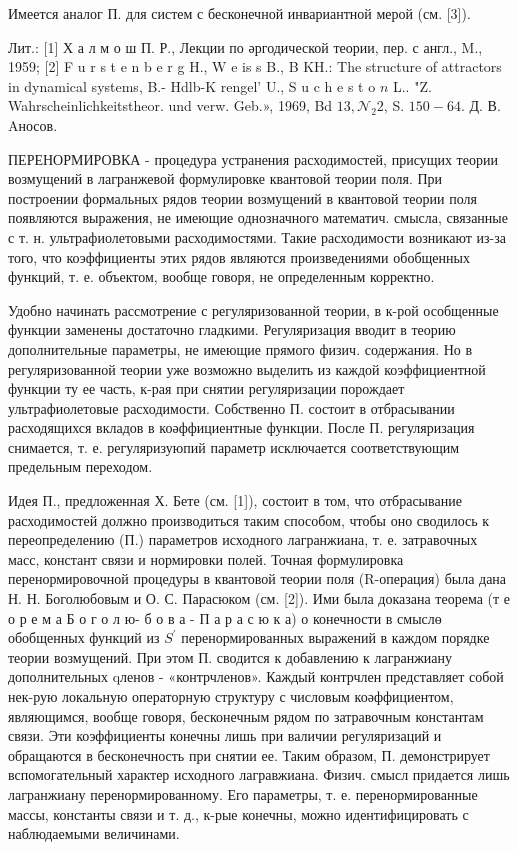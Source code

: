 \documentclass[10pt]{article}
\begin{document}
Имеется аналог П. для систем с бесконечной инвариантной мерой (см. [3]).



Лит.: [1] Х а л м о ш П. Р., Лекции по әргодической теории, пер. с англ., M., 1959; [2] F u r s t e n b e r g H., W e is s B., B KH.: The structure of attractors in dynamical systems, B.- Hdlb-K rengel' U., S u c h e s t o $n$ L.. "Z. Wahrscheinlichkeitstheor. und verw. Geb.», 1969, Bd $13, \mathcal{N}_{2} 2$, S. $150-64$. Д. В. Aносов.



ПЕРЕНОРМИРОВКА - процедура устранения расходимостей, присущих теории возмущений в лагранжевой формулировке квантовой теории поля. При построении формальных рядов теории возмущений в квантовой теории поля появляются выражения, не имеющие однозначного математич. смысла, связанные с т. н. ультрафиолетовыми расходимостями. Такие расходимости возникают из-за того, что коэффициенты этих рядов являются произведениями обобщенных функций, т. е. объектом, вообще говоря, не определенным корректно.



Удобно начинать рассмотрение с регуляризованной теории, в к-рой особщенные функции заменены достаточно гладкими. Регуляризация вводит в теорию дополнительные параметры, не имеющие прямого физич. содержания. Но в регуляризованной теории уже возможно выделить из каждой коэффициентной функции ту ее часть, к-рая при снятии регуляризации порождает ультрафиолетовые расходимости. Собственно П. состоит в отбрасывании расходящихся вкладов в коәффициентные функции. После П. регуляризация снимается, т. е. регуляризуюпий параметр исключается соответствующим предельным переходом.



Идея П., предложенная Х. Бете (см. [1]), состоит в том, что отбрасывание расходимостей должно производиться таким способом, чтобы оно сводилось к переопределению (П.) параметров исходного лагранжиана, т. е. затравочных масс, констант связи и нормировки полей. Точная формулировка перенормировочной процедуры в квантовой теории поля (R-операция) была дана Н. Н. Боголюбовым и О. С. Парасюком (см. [2]). Ими была доказана теорема (т е о р е м а Б о г о л ю- б о в а - П а р а с ю к а) о конечности в смыслө обобщенных функций из $S^{\prime}$ перенормированных выражений в каждом порядке теории возмущений. При этом П. сводится к добавлению к лагранжиану дополнительных qленов - «контрчленов». Каждый контрчлен представляет собой нек-рую локальную операторную структуру с числовым коәффициентом, являющимся, вообще говоря, бесконечным рядом по затравочным константам связи. Эти коэффициенты конечны лишь при валичии регуляризаций и обращаются в бесконечность при снятии ее. Таким образом, П. демонстрирует вспомогательный характер исходного лагравжиана. Физич. смысл придается лишь лагранжиану перенормированному. Его параметры, т. е. перенормированные массы, константы связи и т. д., к-рые конечны, можно идентифицировать с наблюдаемыми величинами.
\end{document}
